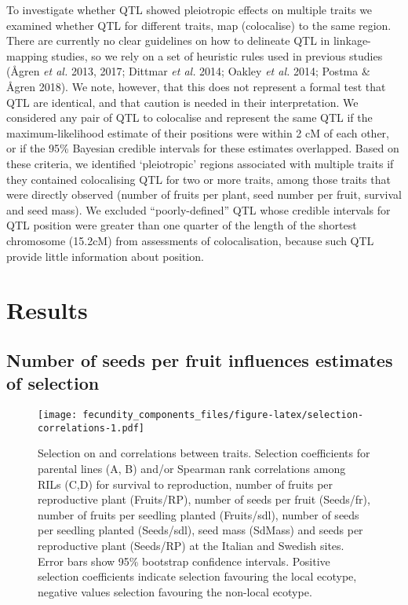 \documentclass[12pt,]{article}
\begin{document}
To investigate whether QTL showed pleiotropic effects on multiple traits we examined whether QTL for different traits, map (colocalise) to the same region.
There are currently no clear guidelines on how to delineate QTL in linkage-mapping studies, so we rely on a set of heuristic rules used in previous studies (Ågren \emph{et al.} 2013, 2017; Dittmar \emph{et al.} 2014; Oakley \emph{et al.} 2014; Postma \& Ågren 2018).
We note, however, that this does not represent a formal test that QTL are identical, and that caution is needed in their interpretation.
We considered any pair of QTL to colocalise and represent the same QTL if the maximum-likelihood estimate of their positions were within 2 cM of each other, or if the 95\% Bayesian credible intervals for these estimates overlapped.
Based on these criteria, we identified `pleiotropic' regions associated with multiple traits if they contained colocalising QTL for two or more traits, among those traits that were directly observed (number of fruits per plant, seed number per fruit, survival and seed mass).
We excluded ``poorly-defined'' QTL whose credible intervals for QTL position were greater than one quarter of the length of the shortest chromosome (15.2cM) from assessments of colocalisation, because such QTL provide little information about position.

\hypertarget{results}{%
\section{Results}\label{results}}

\hypertarget{number-of-seeds-per-fruit-influences-estimates-of-selection}{%
\subsection{Number of seeds per fruit influences estimates of selection}\label{number-of-seeds-per-fruit-influences-estimates-of-selection}}

\begin{figure}
\centering
\texttt{[image: fecundity\_components\_files/figure-latex/selection-correlations-1.pdf]}
\caption{\label{fig:selection-correlations}Selection on and correlations between traits. Selection coefficients for parental lines (A, B) and/or Spearman rank correlations among RILs (C,D) for survival to reproduction, number of fruits per reproductive plant (Fruits/RP), number of seeds per fruit (Seeds/fr), number of fruits per seedling planted (Fruits/sdl), number of seeds per seedling planted (Seeds/sdl), seed mass (SdMass) and seeds per reproductive plant (Seeds/RP) at the Italian and Swedish sites. Error bars show 95\% bootstrap confidence intervals. Positive selection coefficients indicate selection favouring the local ecotype, negative values selection favouring the non-local ecotype.}
\end{figure}
\end{document}
